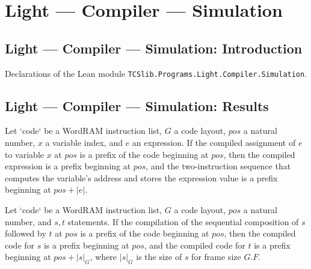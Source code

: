 \section{Light --- Compiler --- Simulation}
\subsection*{Light --- Compiler --- Simulation: Introduction}

Declarations of the Lean module \texttt{TCSlib.Programs.Light.Compiler.Simulation}.

\subsection*{Light --- Compiler --- Simulation: Results}

\begin{theorem}
\label{Light.Compiler.codeAt_set}
\leanok
{}
Let `code` be a WordRAM instruction list, $G$ a code layout, $pos$ a natural number, $x$
a variable index, and $e$ an expression. If the compiled assignment of $e$ to variable
$x$ at $pos$ is a prefix of the code beginning at $pos$, then the compiled expression is
a prefix beginning at $pos$, and the two-instruction sequence that computes the
variable's address and stores the expression value is a prefix beginning at $pos+|e|$.
\end{theorem}

\begin{theorem}
\label{Light.Compiler.codeAt_seq}
\leanok
{}
Let `code` be a WordRAM instruction list, $G$ a code layout, $pos$ a natural number, and
$s,t$ statements. If the compilation of the sequential composition of $s$ followed by
$t$ at $pos$ is a prefix of the code beginning at $pos$, then the compiled code for $s$
is a prefix beginning at $pos$, and the compiled code for $t$ is a prefix beginning at
$pos+|s|_G$, where $|s|_G$ is the size of $s$ for frame size $G.F$.
\end{theorem}

